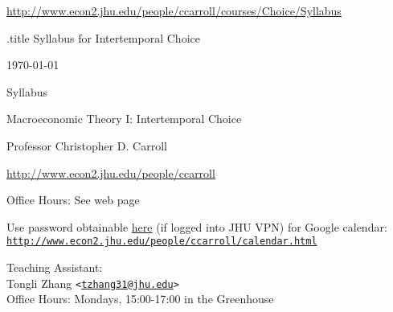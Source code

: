 \documentclass{econtex}
\begin{document}
\begin{center}{{\tiny \url{http://www.econ2.jhu.edu/people/ccarroll/courses/Choice/Syllabus}}}\end{center}


\begin{verbatimwrite}{\jobname.title}
Syllabus for Intertemporal Choice
\end{verbatimwrite}

\thispagestyle{empty}

\newenvironment{blockpar}{\par\begin{minipage}{\textwidth}
\setlength{\parskip}{.5\baselineskip plus 1pt minus 1pt}}{\end{minipage}}

\pagestyle{plain}
\thispagestyle{empty}

\begin{center}
{\tiny \href{http://www.econ2.jhu.edu/people/ccarroll/courses/Choice/Syllabus.pdf}{\jobname} \hfill \today}

{\LARGE Syllabus}
\medskip\medskip

{\LARGE Macroeconomic Theory I: Intertemporal Choice}
\medskip\medskip
\medskip\medskip

\smallskip


Professor Christopher D. Carroll

\medskip

\url{http://www.econ2.jhu.edu/people/ccarroll}

Office Hours: See web page

Use password obtainable \href{https://www.econ2.jhu.edu/people/ccarroll/private/PasswordForCarrollCDCApptsAccount.txt}{here} (if logged into JHU VPN) for Google calendar: \texttt{\href{http://www.econ2.jhu.edu/people/ccarroll/calendar.html}{http://www.econ2.jhu.edu/people/ccarroll/calendar.html}}

\medskip\medskip\medskip
Teaching Assistant:  \\

Tongli Zhang \texttt{<\href{mailto:tzhang31@jhu.edu}{\texttt{tzhang31@jhu.edu}}>}
\\ Office Hours: Mondays, 15:00-17:00 in the Greenhouse

\medskip

\end{center}
\end{document}
